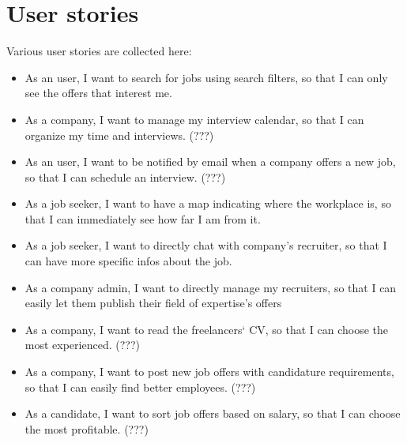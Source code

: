 \documentclass[12pt, a4paper]{article}
\begin{document}
\newpage
\section{User stories}
Various user stories are collected here:
\begin{itemize}
	\item As an user, I want to search for jobs using search filters,
		so that I can only see the offers that interest me.
	\item As a company, I want to manage my interview calendar, 
		so that I can organize my time and interviews. (???)
	\item As an user, I want to be notified by email when a company 
		offers a new job, so that I can schedule an interview. (???)
	\item As a job seeker, I want to have a map indicating where the workplace is,
		so that I can immediately see how far I am from it.
	\item As a job seeker, I want to directly chat with company's recruiter,
		so that I can have more specific infos about the job.
	\item As a company admin, I want to directly manage my recruiters,
		so that I can easily let them publish their field of expertise's offers
	\item As a company, I want to read the freelancers‘ CV, 
		so that I can choose the most experienced. (???)
	\item As a company, I want to post new job offers with candidature 
		requirements, so that I can easily find better employees. (???)
	\item As a candidate, I want to sort job offers based on salary, 
		so that I can choose the most profitable.  (???)
\end{itemize}
\end{document}
